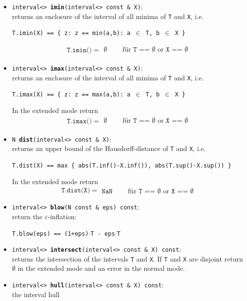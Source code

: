 \documentclass{report}
\begin{document}
\begin{itemize}
			\item \texttt{interval<> {\bf imin}(interval<> const
			\& X)}:\\
returns an enclosure of the interval of all minima of
				 \texttt{T} and \texttt{X}, i.e.
				\begin{center} \texttt{T.imin(X) == \{ z: z == min(a,b): a $\in$ T, b $\in$ X \}}\end{center}
			
				\[
					\texttt{T.imin()} =  \begin{array}{lcl}
					\emptyset&\textrm{\ }&\textrm{f\"ur \ }\texttt{T == $\emptyset$}\textrm{ or }\texttt{X == $\emptyset$} \\
					\end{array}
				\]
			\item \texttt{interval<> {\bf imax}(interval<> const
			\& X)}:\\
returns an enclosure of the interval of all minima of
				 \texttt{T} and \texttt{X}, i.e.
				\begin{center} \texttt{T.imax(X) == \{ z: z == max(a,b): a $\in$ T, b $\in$ X \}}\end{center}
			In the extended mode return	
				\[
					\texttt{T.imax()} =  \begin{array}{lcl}
					\emptyset&\textrm{\ }&\textrm{f\"ur \ }\texttt{T == $\emptyset$}\textrm{ or }\texttt{X == $\emptyset$} \\
					\end{array}
				\]
			\item \texttt{N {\bf dist}(interval<> const \&
					X)}:\\returns an upper bound
					of the
				Hausdorff-distance of \texttt{T} and \texttt{X},
				i.e.
				\begin{center}\texttt{T.dist(X) == max \{ abs(T.inf()-X.inf()), abs(T.sup()-X.sup()) \}}\end{center}
				In the extended mode return	
				\[
					\texttt{T.dist(X)} =  \begin{array}{lcl}
					\texttt{NaN}&\textrm{\ }&\textrm{f\"ur \ }\texttt{T == $\emptyset$}\textrm{ or }\texttt{X == $\emptyset$}
					\end{array}
				\]
			\item \texttt{interval<> {\bf blow}(N const \& eps)
					const}:\\return the $\varepsilon$-inflation:
				\begin{center}
				\texttt{T.blow(eps) == (1+eps)$\cdot$T - eps$\cdot$T}
				\end{center}
			\item \texttt{interval<> {\bf intersect}(interval<>
					const \& X) const}:\\
					returns the intersection of the intervals \texttt{T} and \texttt{X}. 
					If \texttt{T}
					and \texttt{X} are disjoint
					return $\emptyset$ in the
					extended mode and an error in
					the normal mode.
			\item \texttt{interval<> {\bf hull}(interval<> const
					\& X) const}:\\ the interval hull


\end{itemize}
\end{document}
